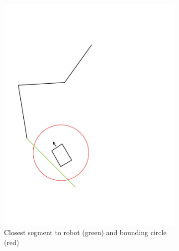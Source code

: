\documentclass{article}
\begin{document}
\begin{figure}[h]
    \centering
    \begin{subfigure}[b]{0.25\textwidth}
        \centering
        \includegraphics[width=\textwidth]{6.141-52.jpg}
        \caption{Closest segment to robot (green) and bounding circle (red)}
    \end{subfigure}
    \hfill
    \begin{subfigure}[b]{0.25\textwidth}
        \centering

\end{subfigure}
\end{figure}
\end{document}
